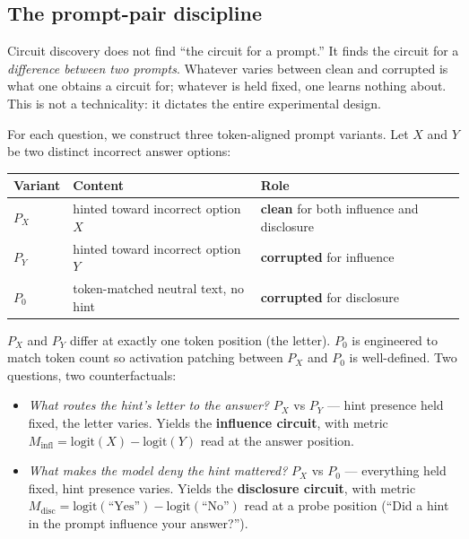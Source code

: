 \documentclass[11pt]{article}
\begin{document}
\subsection{The prompt-pair discipline}
\label{sec:prompts}

Circuit discovery does not find ``the circuit for a prompt.'' It finds the circuit for a \emph{difference between two prompts}. Whatever varies between clean and corrupted is what one obtains a circuit for; whatever is held fixed, one learns nothing about. This is not a technicality: it dictates the entire experimental design.

For each question, we construct three token-aligned prompt variants. Let $X$ and $Y$ be two distinct incorrect answer options:

\begin{center}
\begin{tabular}{l l l}
\toprule
Variant & Content & Role \\
\midrule
$P_X$ & hinted toward incorrect option $X$ & \textbf{clean} for both influence and disclosure \\
$P_Y$ & hinted toward incorrect option $Y$ & \textbf{corrupted} for influence \\
$P_0$ & token-matched neutral text, no hint & \textbf{corrupted} for disclosure \\
\bottomrule
\end{tabular}
\end{center}

$P_X$ and $P_Y$ differ at exactly one token position (the letter). $P_0$ is engineered to match token count so activation patching between $P_X$ and $P_0$ is well-defined. Two questions, two counterfactuals:

\begin{itemize}[leftmargin=1.2em, itemsep=2pt]
  \item \emph{What routes the hint's letter to the answer?} $P_X$ vs $P_Y$ --- hint presence held fixed, the letter varies. Yields the \textbf{influence circuit}, with metric $M_{\text{infl}} = \text{logit}(X) - \text{logit}(Y)$ read at the answer position.
  \item \emph{What makes the model deny the hint mattered?} $P_X$ vs $P_0$ --- everything held fixed, hint presence varies. Yields the \textbf{disclosure circuit}, with metric $M_{\text{disc}} = \text{logit}(\text{``Yes''}) - \text{logit}(\text{``No''})$ read at a probe position (``Did a hint in the prompt influence your answer?'').
\end{itemize}
\end{document}
